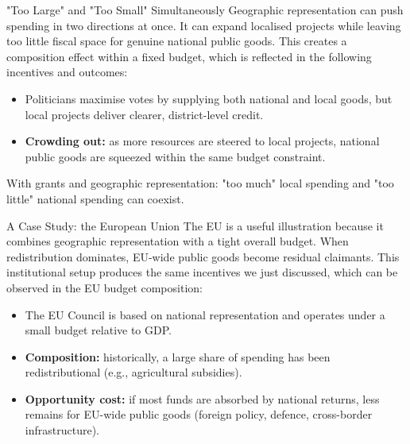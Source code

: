 \documentclass[10pt]{beamer}
\begin{document}
\begin{frame}{"Too Large" and "Too Small" Simultaneously}
Geographic representation can push spending in two directions at once.
It can expand localised projects while leaving too little fiscal space for genuine national public goods. This creates a composition effect within a fixed budget, which is reflected in the following incentives and outcomes:

\begin{itemize}
\item Politicians maximise votes by supplying both national and local goods, but local projects deliver clearer, district-level credit.
\item \textbf{Crowding out:} as more resources are steered to local projects, national public goods are squeezed within the same budget constraint.
\end{itemize}

\vspace{0.15cm}
\alert{\footnotesize With grants and geographic representation: "too much" local spending and "too little" national spending can coexist.}
\end{frame}

\begin{frame}{A Case Study: the European Union}
The EU is a useful illustration because it combines geographic representation with a tight overall budget.
When redistribution dominates, EU-wide public goods become residual claimants. This institutional setup produces the same incentives we just discussed, which can be observed in the EU budget composition:


\begin{itemize}
\item The EU Council is based on national representation and operates under a small budget relative to GDP.
\item \textbf{Composition:} historically, a large share of spending has been redistributional (e.g., agricultural subsidies).
\item \textbf{Opportunity cost:} if most funds are absorbed by national returns, less remains for EU-wide public goods (foreign policy, defence, cross-border infrastructure).
\end{itemize}

\end{frame}
\end{document}
